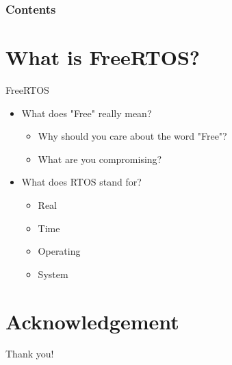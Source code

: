 \documentclass[10pt]{beamer}
\title[Universidad Panamericana]{}
\subtitle{Introduction to FreeRTOS}
\author[]{Name}
\institute[ltonix@up.edu.mx]{Universidad Panamericana}
\date[Presentation \today]
{Presentation \today}
\begin{document}
\frame{\titlepage}
\begin{frame}
\frametitle{Contents}
\tableofcontents
\end{frame}

\section{What is FreeRTOS?}
    \begin{frame}{FreeRTOS}
      \begin{itemize}
        \item What does "Free" really mean?
            \begin{itemize}
                \item Why should you care about the word "Free"?
                \item What are you compromising?
            \end{itemize}
        \item What does RTOS stand for?
            \begin{itemize}
                \item Real
                \item Time
                \item Operating
                \item System
            \end{itemize}
      \end{itemize}
    \end{frame}

\section*{Acknowledgement}  
\begin{frame}
\textcolor{myNewColorA}{\Huge{\centerline{Thank you!}}}
\end{frame}
\end{document}
